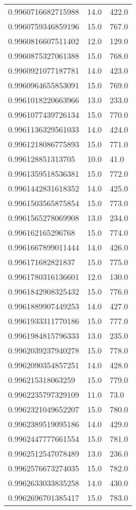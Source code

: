\begin{center}
\begin{supertabular}[H]{p{0.30\textwidth}p{0.05\textwidth}p{0.05\textwidth}}
0.9960716682715988 & 14.0 & 422.0 \\ 
0.9960759346859196 & 15.0 & 767.0 \\ 
0.9960816607511402 & 12.0 & 129.0 \\ 
0.9960875327061388 & 15.0 & 768.0 \\ 
0.9960921077187781 & 14.0 & 423.0 \\ 
0.9960964655853091 & 15.0 & 769.0 \\ 
0.9961018220663966 & 13.0 & 233.0 \\ 
0.9961077439726134 & 15.0 & 770.0 \\ 
0.9961136329561033 & 14.0 & 424.0 \\ 
0.9961218086775893 & 15.0 & 771.0 \\ 
0.996128851313705 & 10.0 & 41.0 \\ 
0.9961359518536381 & 15.0 & 772.0 \\ 
0.9961442831618352 & 14.0 & 425.0 \\ 
0.9961503565875854 & 15.0 & 773.0 \\ 
0.9961565278069908 & 13.0 & 234.0 \\ 
0.996162165296768 & 15.0 & 774.0 \\ 
0.9961667899011444 & 14.0 & 426.0 \\ 
0.996171682821837 & 15.0 & 775.0 \\ 
0.9961780316136601 & 12.0 & 130.0 \\ 
0.9961842908325432 & 15.0 & 776.0 \\ 
0.9961889907449253 & 14.0 & 427.0 \\ 
0.9961933311770186 & 15.0 & 777.0 \\ 
0.9961984815796333 & 13.0 & 235.0 \\ 
0.9962039237940278 & 15.0 & 778.0 \\ 
0.9962090354857251 & 14.0 & 428.0 \\ 
0.996215318063259 & 15.0 & 779.0 \\ 
0.9962235797329109 & 11.0 & 73.0 \\ 
0.9962321049652207 & 15.0 & 780.0 \\ 
0.9962389519095186 & 14.0 & 429.0 \\ 
0.9962447777661554 & 15.0 & 781.0 \\ 
0.9962512547078489 & 13.0 & 236.0 \\ 
0.9962576673274035 & 15.0 & 782.0 \\ 
0.9962633033835258 & 14.0 & 430.0 \\ 
0.9962696701385417 & 15.0 & 783.0 \\ 

\end{supertabular}
\end{center}
